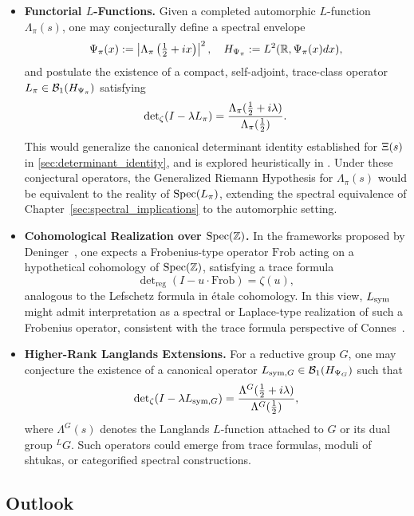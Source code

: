 \begin{itemize}
  \item \textbf{Functorial \( L \)-Functions.}  
  Given a completed automorphic \( L \)-function \( \Lambda_\pi(s) \), one may conjecturally define a spectral envelope
  \[
  \Psi_\pi(x) := \left| \Lambda_\pi\left( \tfrac{1}{2} + i x \right) \right|^2, \quad
  H_{\Psi_\pi} := L^2(\mathbb{R}, \Psi_\pi(x) dx),
  \]
  and postulate the existence of a compact, self-adjoint, trace-class operator \( L_\pi \in \mathcal{B}_1(H_{\Psi_\pi}) \) satisfying
  \[
  \det\nolimits_{\zeta}(I - \lambda L_\pi) = \frac{\Lambda_\pi(\tfrac{1}{2} + i\lambda)}{\Lambda_\pi(\tfrac{1}{2})}.
  \]
  This would generalize the canonical determinant identity established for \( \Xi(s) \) in \cref{sec:determinant_identity}, and is explored heuristically in .
  Under these conjectural operators, the Generalized Riemann Hypothesis for \(\Lambda_\pi(s)\) would be equivalent to the reality of \(\operatorname{Spec}(L_\pi)\), extending the spectral equivalence of Chapter~\ref{sec:spectral_implications} to the automorphic setting.

  \item \textbf{Cohomological Realization over \( \operatorname{Spec}(\mathbb{Z}) \).}  
  In the frameworks proposed by Deninger~\cite{Deninger1998Frobenius}, one expects a Frobenius-type operator \( \mathrm{Frob} \) acting on a hypothetical cohomology of \( \operatorname{Spec}(\mathbb{Z}) \), satisfying a trace formula
  \[
  \det\nolimits_{\mathrm{reg}}(I - u \cdot \mathrm{Frob}) = \zeta(u),
  \]
  analogous to the Lefschetz formula in étale cohomology. In this view, \( L_{\mathrm{sym}} \) might admit interpretation as a spectral or Laplace-type realization of such a Frobenius operator, consistent with the trace formula perspective of Connes~\cite{Connes1999TraceFormula}.

  \item \textbf{Higher-Rank Langlands Extensions.}  
  For a reductive group \( G \), one may conjecture the existence of a canonical operator \( L_{\mathrm{sym},G} \in \mathcal{B}_1(H_{\Psi_G}) \) such that
  \[
  \det\nolimits_{\zeta}(I - \lambda L_{\mathrm{sym},G}) = \frac{\Lambda^G(\tfrac{1}{2} + i\lambda)}{\Lambda^G(\tfrac{1}{2})},
  \]
  where \( \Lambda^G(s) \) denotes the Langlands \( L \)-function attached to \( G \) or its dual group \( {}^LG \). Such operators could emerge from trace formulas, moduli of shtukas, or categorified spectral constructions.
\end{itemize}

\subsection*{Outlook}

